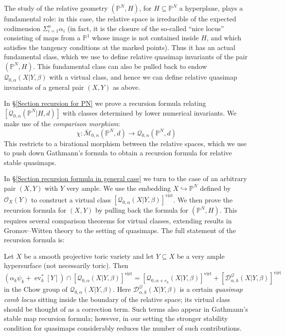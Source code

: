 \documentclass[10pt]{amsart}
\newcommand{\M}[4]{\overline{\mathcal{M}}_{#1,#2}(#3,#4)}
\newcommand{\Q}[4]{\mathcal{Q}_{#1,#2}(#3,#4)}
\newcommand{\PP}{\mathbb P}
\newcommand{\OO}{\mathcal{O}}
\renewcommand{\to}{\rightarrow}
\newcommand{\comp}{\chi}
\newcommand{\virt}[1]{[#1]^{\operatorname{virt}}}
\newcommand{\ev}{\operatorname{ev}}
\theoremstyle{definition}
\newenvironment{customthm}[1]
  {\renewcommand\theinnercustomthm{#1}\innercustomthm}
  {\endinnercustomthm}
\theoremstyle{definition}
\begin{document}
The study of the relative geometry $(\PP^N,H)$, for $H \subseteq \PP^N$ a hyperplane, plays a fundamental role: in this case, the relative space is irreducible of the expected codimension $\Sigma_{i=1}^n \alpha_i$ (in fact, it is the closure of the so-called ``nice locus'' consisting of maps from a $\PP^1$ whose image is not contained inside $H$, and which satisfies the tangency conditions at the marked points). Thus it has an actual fundamental class, which we use to define relative quasimap invariants of the pair $(\PP^N,H)$. This fundamental class can also be pulled back to endow $\Q{0}{\alpha}{X|Y}{\beta}$ with a virtual  class, and hence we can define relative quasimap invariants of a general pair $(X,Y)$ as above.

In \S \ref{Section recursion for PN} we prove a recursion formula relating $[\Q{0}{\alpha}{\PP^N|H}{d}]$ with classes determined by lower numerical invariants. We make use of the \emph{comparison morphism}:
\begin{equation*} \comp : \M{0}{n}{\PP^N}{d} \to \Q{0}{n}{\PP^N}{d} \end{equation*} 
This restricts to a birational morphism between the relative spaces, which we use to push down Gathmann's formula to obtain a recursion formula for relative stable quasimaps.

In \S \ref{Section recursion formula in general case} we turn to the case of an arbitrary pair $(X,Y)$ with $Y$ very ample. We use the embedding $X \hookrightarrow \PP^N$ defined by $\OO_X(Y)$ to construct a virtual class $\virt{\Q{0}{\alpha}{X|Y}{\beta}}$.
We then prove the recursion formula for $(X,Y)$ by pulling back the formula for $(\PP^N,H)$. This requires several comparison theorems for virtual classes, extending results in Gromov--Witten theory to the setting of quasimaps. The full statement of the recursion formula is:

\begin{customthm}{D}[\textbf{Theorem \ref{Theorem general recursion}}] \label{thm recursion intro} Let $X$ be a smooth projective toric variety and let $Y \subseteq X$ be a very ample hypersurface (not necessarily toric). Then
\begin{equation*} (\alpha_k \psi_k + \ev_k^* [Y]) \cap \virt{\Q{0}{\alpha}{X|Y}{\beta}} = \virt{\Q{0}{\alpha+e_k}{X|Y}{\beta}} + \virt{\mathcal D^\mathcal{Q}_{\alpha,k}(X|Y,\beta)} \end{equation*}
in the Chow group of $\Q{0}{\alpha}{X|Y}{\beta}$. 
\end{customthm}
\noindent Here $\mathcal D^\mathcal{Q}_{\alpha,k}(X|Y,\beta)$ is a certain \emph{quasimap comb locus} sitting inside the boundary of the relative space; its virtual class should be thought of as a correction term. Such terms also appear in Gathmann's stable map recursion formula; however, in our setting the stronger stability condition for quasimaps considerably reduces the number of such contributions.
\end{document}
